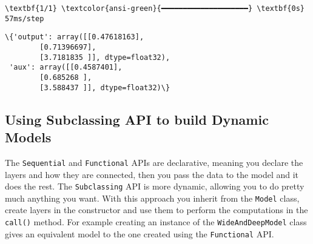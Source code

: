 \documentclass[12pt letter]{report}
\makeatletter
\newcommand{\boxspacing}{\kern\kvtcb@left@rule\kern\kvtcb@boxsep}
\newcommand{\prompt}[4]{
        {\ttfamily\llap{{\color{#2}[#3]:\hspace{3pt}#4}}\vspace{-\baselineskip}}
    }
\makeatother
\begin{document}
    \begin{Verbatim}[commandchars=\\\{\}]
\textbf{1/1} \textcolor{ansi-green}{━━━━━━━━━━━━━━━━━━━━} \textbf{0s} 57ms/step
    \end{Verbatim}

            \begin{tcolorbox}[breakable, size=fbox, boxrule=.5pt, pad at break*=1mm, opacityfill=0]
\prompt{Out}{outcolor}{ }{\boxspacing}
\begin{Verbatim}[commandchars=\\\{\}]
\{'output': array([[0.47618163],
        [0.71396697],
        [3.7181835 ]], dtype=float32),
 'aux': array([[0.4587401],
        [0.685268 ],
        [3.588437 ]], dtype=float32)\}
\end{Verbatim}
\end{tcolorbox}
        
\subsection{Using Subclassing API to build Dynamic
Models}\label{using-subclassing-api-to-build-dynamic-models}

The \texttt{Sequential} and \texttt{Functional} APIs are declarative,
meaning you declare the layers and how they are connected, then you pass
the data to the model and it does the rest. The \texttt{Subclassing} API
is more dynamic, allowing you to do pretty much anything you want. With
this approach you inherit from the \texttt{Model} class, create layers
in the constructor and use them to perform the computations in the
\texttt{call()} method. For example creating an instance of the
\texttt{WideAndDeepModel} class gives an equivalent model to the one
created using the \texttt{Functional} API.
\end{document}
